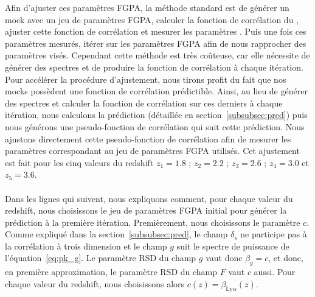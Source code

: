Afin d'ajuster ces paramètres FGPA, la méthode standard est de générer un mock avec un jeu de paramètres FGPA, calculer la fonction de corrélation du \lya{}, ajuster cette fonction de corrélation et mesurer les paramètres \lya{}. Puis une fois ces paramètres mesurés, itérer sur les paramètres FGPA afin de nous rapprocher des paramètres \lya{} visés. Cependant cette méthode est très coûteuse, car elle nécessite de générer des spectres et de produire la fonction de corrélation à chaque itération.
Pour accélérer la procédure d'ajustement, nous tirons profit du fait que nos mocks possèdent une fonction de corrélation prédictible.
Ainsi, au lieu de générer des spectres et calculer la fonction de corrélation sur ces derniers à chaque itération, nous calculons la prédiction (détaillée en section~\ref{subsubsec:pred}) puis nous générons une pseudo-fonction de corrélation qui suit cette prédiction. Nous ajustons directement cette pseudo-fonction de corrélation afin de mesurer les paramètres \lya{} correspondant au jeu de paramètres FGPA utilisés.
Cet ajustement est fait pour les cinq valeurs du redshift $z_1 = \num{1.8}$ ; $z_2 = \num{2.2}$ ; $z_3 = \num{2.6}$ ; $z_4 = \num{3.0}$ et $z_5 = \num{3.6}$.

\paragraph{}
Dans les lignes qui suivent, nous expliquons comment, pour chaque valeur du redshift, nous choisissons le jeu de paramètres FGPA initial pour générer la prédiction à la première itération.
Premièrement, nous choisissons le paramètre $c$.
Comme expliqué dans la section~\ref{subsubsec:pred}, le champ $\delta_s$ ne participe pas à la corrélation à trois dimension et le champ $g$ suit le spectre de puissance de l'équation~\ref{eq:pk_g}. Le paramètre RSD du champ $g$ vaut donc $\beta_g = c$, et donc, en première approximation, le paramètre RSD du champ $F$ vaut $c$ aussi. Pour chaque valeur du redshift, nous choisissons alors $c(z) = \beta_{\mathrm{Ly}\alpha}(z)$.

